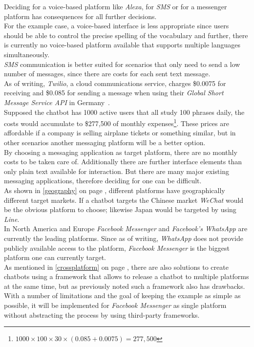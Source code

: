 Deciding for a voice-based platform like \emph{Alexa}, for \emph{SMS} or for a messenger platform has consequences
for all further decisions.
\\
For the example case, a voice-based interface is less appropriate since
users should be able to control the precise spelling of the vocabulary
and further, there is currently no voice-based platform available
that supports multiple languages simultaneously.
\\

\emph{SMS} communication is better suited for scenarios that only need to send a low number of messages,
since there are costs for each sent text message.
\\
As of writing, \emph{Twilio}, a cloud communications service, charges \$0.0075 for receiving and \$0.085 for sending a message when using their \emph{Global Short Message Service API} in Germany~\cite{twilio}.
\\
Supposed the chatbot has 1000 active users that all study 100 phrases daily,
the costs would accumulate to \$277,500 of monthly expenses\footnote{$1000\times100\times30\times(0.085+0.0075)=277,500$}.
These prices are affordable if a company is selling airplane tickets or something similar,
but in other scenarios another messaging platform will be a better option.
\\

By choosing a messaging application as target platform, there are no monthly costs to be taken care of.
Additionally there are further interface elements than only plain text available for interaction.
But there are many major existing messaging applications, therefore deciding for one can be difficult.
\\
As shown in \ref{geography} on page \pageref{geography}, different platforms have geographically different target markets.
If a chatbot targets the Chinese market \emph{WeChat} would be the obvious platform to choose;
likewise Japan would be targeted by using\emph{ Line}.
\\
In North America and Europe \emph{Facebook Messenger} and \emph{Facebook's WhatsApp} are currently the leading platforms.
Since as of writing, \emph{WhatsApp} does not provide publicly available access to the platform,
\emph{Facebook Messenger} is the biggest platform one can currently target.
\\

As mentioned in \ref{crossplatform} on page \pageref{crossplatform},
there are also solutions to create chatbots using a framework that allows to release a chatbot to multiple platforms at the same time,
but as previously noted such a framework also has drawbacks.
\\
With a number of limitations and the goal of keeping the example as simple as possible,
it will be implemented for \emph{Facebook Messenger} as single platform without abstracting the process by using third-party frameworks.
\\

